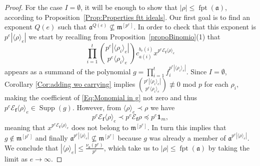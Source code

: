 \documentclass[10pt,a4paper]{amsart}
\newcommand{\Bf}{\boldsymbol{f}}
\newcommand{\E}{\mathcal{E}}
\newcommand{\Supp}{\operatorname{Supp}}
\newcommand{\fa}{\mathfrak{a}}
\newcommand{\fpt}{{\operatorname{fpt}}}
\newcommand{\m}{\mathfrak{m}}
\begin{document}
\begin{proof}
	For the case $I= \emptyset$, it will be enough to show that $|\rho| \leq \fpt(\fa)$, according to Proposition~\ref{Prop:Properties ftt ideals}. Our first goal is to find an exponent $Q(e)$ such that $\fa^{Q(e)} \nsubseteq  \m^{[p^{e}]}$. In order to check that this exponent is $p^{e} |\langle \rho \rangle_e|$ we start by recalling from Proposition~\ref{propoBinomio}(1) that
	\begin{equation}\label{Eq:Monomial in g}
		\prod_{i=1}^{t}\binom{p^{e}|\langle \rho_i \rangle_e|}{p^{e}\langle \rho_i \rangle_e}c_{a(i)}^{b_{e}(i)}x^{p^{e}\E_{\Bf} \langle \rho \rangle_e}
	\end{equation}
	appears as a summand of the polynomial  $g=\prod_{i=1}^{t} f_i^{p^{e}|\langle \rho_i \rangle_e|}$. Since $I=\emptyset$,  Corollary \ref{Cor:adding wo carrying} implies $\binom{p^{e}|\langle \rho_i \rangle_e|}{p^{e}\langle \rho_i \rangle_e} \not \equiv 0$ mod $p$ for each $\rho_i$, making the coefficient of \eqref{Eq:Monomial in g} not zero and thus $p^{e}\E_{\Bf} \langle \rho \rangle_e \in \Supp(g)$. However, from $\langle \rho \rangle_e \prec \rho$ we have 
	\[p^{e}\E_{\Bf} \langle \rho \rangle_e \prec p^{e}\E_{\Bf} \rho \preceq p^{e}\textbf{1}_m,
	\]
	meaning that  $x^{p^{e}\E_{\Bf} \langle \rho \rangle_e}$ does not belong to 
	 $\m^{[p^{e}]}$. In turn this implies that $g \notin \m^{[p^{e}]}$ and finally $\fa^{p^{e} |\langle \rho \rangle_e|} \nsubseteq  \m^{[p^{e}]}$ because $g$ was already a member of $\fa^{p^{e}|\langle \rho \rangle_e|}$. We conclude that $|\langle \rho \rangle_e| \leq \frac{\nu_{\fa}(p^{e})}{p^{e}}$, which take us to $|\rho| \leq \fpt(\fa)$ by taking the limit as $e \to \infty$.
	

\end{proof}
\end{document}
